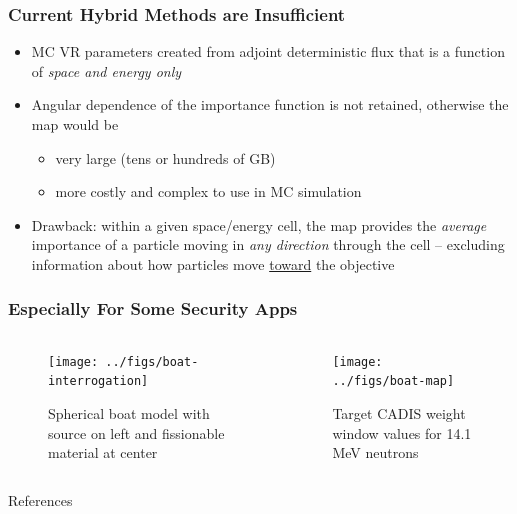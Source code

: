 \documentclass[xcolor=x11names,compress]{beamer}
\renewcommand{\(}{\begin{columns}}
\renewcommand{\)}{\end{columns}}
\newcommand{\<}[1]{\begin{column}{#1}}
\renewcommand{\>}{\end{column}}
\begin{document}
\begin{frame}[fragile]
  \frametitle{Current Hybrid Methods are Insufficient}

	\begin{itemize}
	\item MC VR parameters created from adjoint deterministic flux that is a
	      function of \emph{space and energy only}
	\item Angular dependence of the importance function is not retained, otherwise
	      the map would be
	  \begin{itemize}
	  \item very large (tens or hundreds of GB)
	  \item more costly and complex to use in MC simulation
      \end{itemize}	   
	\item Drawback: within a given space/energy cell, the map provides the
	      \emph{average} importance of a particle moving in \emph{any direction}
	      through the cell -- excluding information about how particles move
	      \underline{toward} the objective
	\end{itemize}

\end{frame}

\begin{frame}[fragile]
  \frametitle{Especially For Some Security Apps \cite{Peplow2012}}

	\begin{columns}
  	\begin{column}{0.5\textwidth}
 	 \begin{center}
 	 \begin{figure}
 	 \texttt{[image: ../figs/boat-interrogation]}  
 	 \caption{Spherical boat model with source on left and fissionable material at center}
 	 \end{figure}
 	 \end{center}
  	\end{column}
 	\begin{column}{0.5\textwidth}
 	 \begin{center}
 	 \begin{figure}
 	 \texttt{[image: ../figs/boat-map]}  
 	 \caption{Target CADIS weight window values for 14.1 MeV neutrons}
 	 \end{figure}
 	 \end{center}
  	\end{column}
	\end{columns}

\end{frame}

\begin{frame}[allowframebreaks]{References}
	
	
\end{frame}
\end{document}
